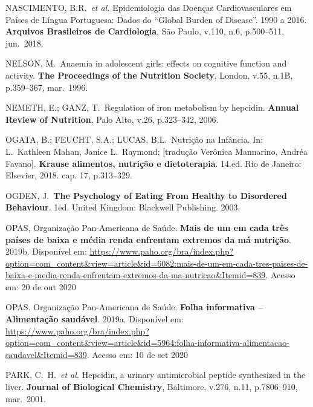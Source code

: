 \bigbreak

\noindent NASCIMENTO, B.R.\ \textit{et al.} Epidemiologia das Doenças Cardiovasculares em Países de Língua Portuguesa: Dados do “Global Burden of Disease”. 1990 a 2016. \textbf{Arquivos Brasileiros de Cardiologia}, São Paulo, v.110, n.6, p.500--511, jun.\ 2018.

\bigbreak

\noindent NELSON, M.\ Anaemia in adolescent girls: effects on cognitive function and activity. \textbf{The Proceedings of the Nutrition Society}, London, v.55, n.1B, p.359--367, mar.\ 1996.

\bigbreak

\noindent NEMETH, E.; GANZ, T.\ Regulation of iron metabolism by hepcidin. \textbf{Annual Review of Nutrition}, Palo Alto, v.26, p.323--342, 2006.

\bigbreak

\noindent OGATA, B.; FEUCHT, S.A.; LUCAS, B.L.\ Nutrição na Infância. In: L.\ Kathleen Mahan, Janice L.\ Raymond; [tradução Verônica Mannarino, Andréa Favano]. \textbf{Krause alimentos, nutrição e dietoterapia}. 14.ed. Rio de Janeiro: Elsevier, 2018. cap. 17, p.313--329.

\bigbreak

\noindent OGDEN, J.\ \textbf{The Psychology of Eating From Healthy to Disordered Behaviour}. 1ed. United Kingdom: Blackwell Publishing. 2003.

\bigbreak

\noindent OPAS, Organização Pan-Americana de Saúde. \textbf{Mais de um em cada três países de baixa e média renda enfrentam extremos da má nutrição}. 2019b. Disponível em: \url{https://www.paho.org/bra/index.php?option=com\_content\&view=article\&id=6082:mais-de-um-em-cada-tres-paises-de-baixa-e-media-renda-enfrentam-extremos-da-ma-nutricao\&Itemid=839}. Acesso em: 20 de out 2020

\bigbreak

\noindent OPAS. Organização Pan-Americana de Saúde. \textbf{Folha informativa – Alimentação saudável}. 2019a. Disponível em: \url{https://www.paho.org/bra/index.php?option=com\_content\&view=article\&id=5964:folha-informativa-alimentacao-saudavel\&Itemid=839}. Acesso em: 10 de set 2020

\bigbreak

\noindent PARK, C.\ H.\ \textit{et al.} Hepcidin, a urinary antimicrobial peptide synthesized in the liver. \textbf{Journal of Biological Chemistry}, Baltimore, v.276, n.11, p.7806--910, mar.\ 2001.


